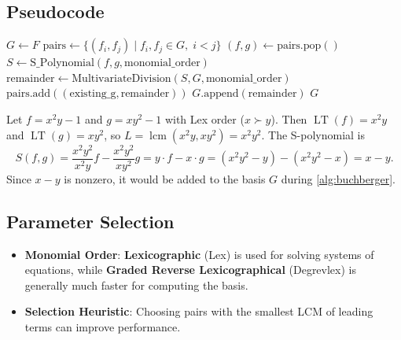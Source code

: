 

\subsection{Pseudocode}
\begin{algorithm}[ht]
\label{alg:buchberger}
\begin{algorithmic}[1]
    \State $G \gets F$
    \State $\text{pairs} \gets \{(f_i, f_j) \mid f_i, f_j \in G,\; i < j\}$
        \State $(f, g) \gets \text{pairs.pop}()$
        \State $S \gets \text{S\_Polynomial}(f, g, \text{monomial\_order})$
        \State $\text{remainder} \gets \text{MultivariateDivision}(S, G, \text{monomial\_order})$
                \State $\text{pairs.add}((\text{existing\_g}, \text{remainder}))$
            \EndFor
            \State $G.\text{append}(\text{remainder})$
        \EndIf
    \EndWhile
    \State \Return $G$
\EndFunction
\end{algorithmic}
\end{algorithm}

\begin{example}\label{ex:s_polynomial}
Let $f = x^2 y - 1$ and $g = xy^2 - 1$ with Lex order ($x \succ y$). Then $\operatorname{LT}(f) = x^2 y$ and $\operatorname{LT}(g) = xy^2$, so $L = \operatorname{lcm}(x^2 y, xy^2) = x^2 y^2$. The S-polynomial is
\[
S(f, g) = \frac{x^2 y^2}{x^2 y} f - \frac{x^2 y^2}{xy^2} g = y \cdot f - x \cdot g = (x^2 y^2 - y) - (x^2 y^2 - x) = x - y.
\]
Since $x - y$ is nonzero, it would be added to the basis $G$ during \cref{alg:buchberger}.
\end{example}

\subsection{Parameter Selection}
\begin{itemize}
    \item \textbf{Monomial Order}: \textbf{Lexicographic} (Lex) is used for solving systems of equations, while \textbf{Graded Reverse Lexicographical} (Degrevlex) is generally much faster for computing the basis.
    \item \textbf{Selection Heuristic}: Choosing pairs with the smallest LCM of leading terms can improve performance.
\end{itemize}

